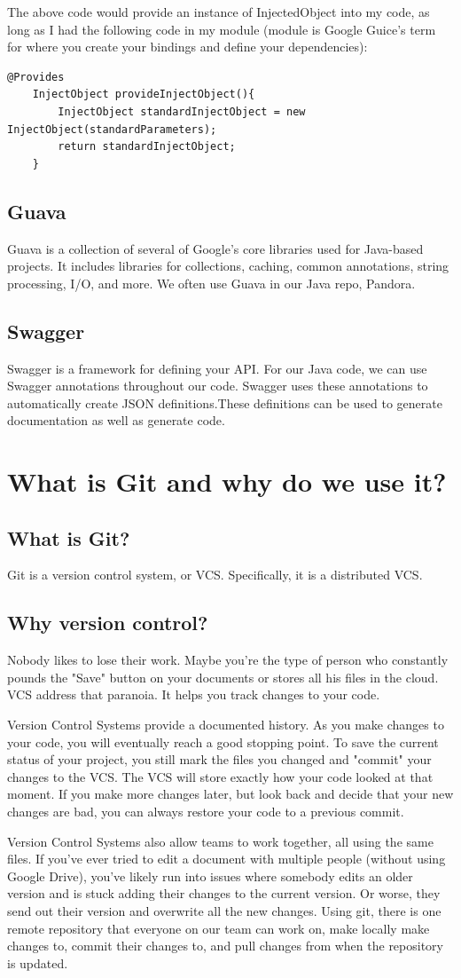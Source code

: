 \documentclass[oneside]{book}
\begin{document}
The above code would provide an instance of InjectedObject into my code, as long as I had the following code in my module (module is Google Guice's term for where you create your bindings and define your dependencies):
\begin{lstlisting}
@Provides
	InjectObject provideInjectObject(){
		InjectObject standardInjectObject = new InjectObject(standardParameters);
		return standardInjectObject;
	}
\end{lstlisting}
\section{Guava}
Guava is a collection of several of Google's core libraries used for Java-based projects. It includes libraries for collections, caching, common annotations, string processing, I/O, and more. We often use Guava in our Java repo, Pandora.
\section{Swagger}
Swagger is a framework for defining your API. For our Java code, we can use Swagger annotations throughout our code. Swagger uses these annotations to automatically create JSON definitions.These definitions can be used to generate documentation as well as generate code.
\chapter{What is Git and why do we use it?}
\section{What is Git?}
Git is a version control system, or VCS. Specifically, it is a distributed VCS.
\section{Why version control?}
Nobody likes to lose their work. Maybe you're the type of person who constantly pounds the "Save" button on your documents or stores all his files in the cloud. VCS address that paranoia. It helps you track changes to your code.\par
Version Control Systems provide a documented history. As you make changes to your code, you will eventually reach a good stopping point. To save the current status of your project, you still mark the files you changed and "commit" your changes to the VCS. The VCS will store exactly how your code looked at that moment. If you make more changes later, but look back and decide that your new changes are bad, you can always restore your code to a previous commit.\par
Version Control Systems also allow teams to work together, all using the same files. If you've ever tried to edit a document with multiple people (without using Google Drive), you've likely run into issues where somebody edits an older version and is stuck adding their changes to the current version. Or worse, they send out their version and overwrite all the new changes. Using git, there is one remote repository that everyone on our team can work on, make locally make changes to, commit their changes to, and pull changes from when the repository is updated.
\end{document}
